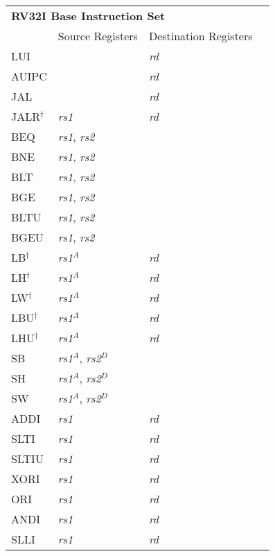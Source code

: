 \begin{tabular}{p{25mm}|p{3cm}|p{6cm}|p{4cm}}
  \multicolumn{4}{l}{\bf RV32I Base Instruction Set} \\
  \cline{2-3}
   & Source Registers & Destination Registers \\
  \cline{2-3}
   LUI &  & {\em rd} &  \\
   \cline{2-3}
   AUIPC &  & {\em rd} &  \\
   \cline{2-3}
   JAL &  & {\em rd} & \\
   \cline{2-3}
   JALR$^\dagger$ & {\em rs1} & {\em rd} & \\
   \cline{2-3}
   BEQ & {\em rs1}, {\em rs2} &  &  \\
   \cline{2-3}
   BNE & {\em rs1}, {\em rs2} &  &  \\
   \cline{2-3}
   BLT & {\em rs1}, {\em rs2} &  &  \\
   \cline{2-3}
   BGE & {\em rs1}, {\em rs2} &  &  \\
   \cline{2-3}
   BLTU & {\em rs1}, {\em rs2} &  &  \\
   \cline{2-3}
   BGEU & {\em rs1}, {\em rs2} &  &  \\
   \cline{2-3}
   LB$^\dagger$ & {\em rs1}$^A$ & {\em rd} &  \\
   \cline{2-3}
   LH$^\dagger$ & {\em rs1}$^A$ & {\em rd} &  \\
   \cline{2-3}
   LW$^\dagger$ & {\em rs1}$^A$ & {\em rd} &  \\
   \cline{2-3}
   LBU$^\dagger$ & {\em rs1}$^A$ & {\em rd} &  \\
   \cline{2-3}
   LHU$^\dagger$ & {\em rs1}$^A$ & {\em rd} &  \\
   \cline{2-3}
   SB & {\em rs1}$^A$, {\em rs2}$^D$ &  &  \\
   \cline{2-3}
   SH & {\em rs1}$^A$, {\em rs2}$^D$ &  &  \\
   \cline{2-3}
   SW & {\em rs1}$^A$, {\em rs2}$^D$ &  &  \\
   \cline{2-3}
   ADDI & {\em rs1} & {\em rd} &  \\
   \cline{2-3}
   SLTI & {\em rs1} & {\em rd} &  \\
   \cline{2-3}
   SLTIU & {\em rs1} & {\em rd} &  \\
   \cline{2-3}
   XORI & {\em rs1} & {\em rd} &  \\
   \cline{2-3}
   ORI & {\em rs1} & {\em rd} &  \\
   \cline{2-3}
   ANDI & {\em rs1} & {\em rd} &  \\
   \cline{2-3}
   SLLI & {\em rs1} & {\em rd} &  \\

\end{tabular}
